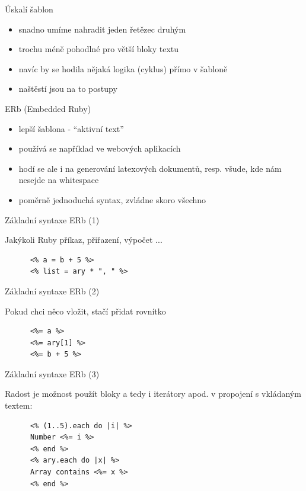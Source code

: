 \documentclass{beamer}
\begin{document}
\begin{frame}{Úskalí šablon}
  \begin{itemize}
    \item snadno umíme nahradit jeden řetězec druhým
    \item trochu méně pohodlné pro větší bloky textu
    \item navíc by se hodila nějaká logika (cyklus) přímo v šabloně
    \item naštěstí jsou na to postupy
  \end{itemize}
\end{frame}

\begin{frame}{ERb (Embedded Ruby)}
  \begin{itemize}
    \item lepší šablona - ``aktivní text''
    \item používá se například ve webových aplikacích
    \item hodí se ale i na generování latexových dokumentů, resp. všude, kde nám nesejde na whitespace
    \item poměrně jednoduchá syntax, zvládne skoro všechno
  \end{itemize}
\end{frame}


\begin{frame}[fragile]{Základní syntaxe ERb (1)}
  \begin{block}{ }
    Jakýkoli Ruby příkaz, přiřazení, výpočet ...
    \scriptsize
    \begin{verbatim}
      <% a = b + 5 %>
      <% list = ary * ", " %>
    \end{verbatim}
  \end{block}
\end{frame}

\begin{frame}[fragile]{Základní syntaxe ERb (2)}
  \begin{block}{ }
    Pokud chci něco vložit, stačí přidat rovnítko
    \scriptsize
    \begin{verbatim}
      <%= a %>
      <%= ary[1] %>
      <%= b + 5 %>
    \end{verbatim}
  \end{block}
\end{frame}

\begin{frame}[fragile]{Základní syntaxe ERb (3)}
  \begin{block}{ }
    Radost je možnost použít bloky a tedy i iterátory apod. v propojení s vkládaným textem:
    \scriptsize
    \begin{verbatim}
      <% (1..5).each do |i| %>
      Number <%= i %>
      <% end %>
      <% ary.each do |x| %>
      Array contains <%= x %>
      <% end %>
    \end{verbatim}
  \end{block}
\end{frame}
\end{document}
